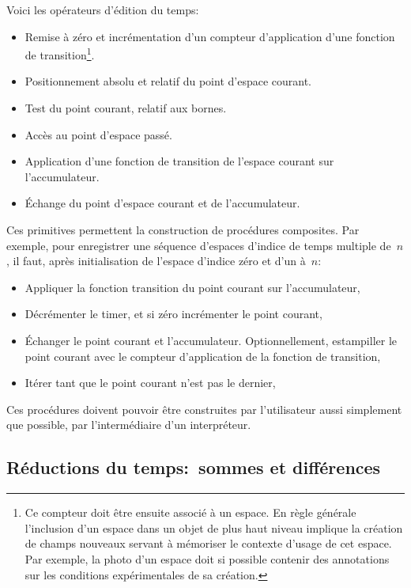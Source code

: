 Voici les op\'erateurs d'\'edition du temps:
\begin{itemize}
\item Remise \`a z\'ero et incr\'ementation d'un compteur d'application
  d'une fonction de transition\footnote{%
    Ce compteur doit \^etre ensuite associ\'e \`a un espace. %
    En r\`egle g\'en\'erale l'inclusion d'un espace dans un objet de plus
    haut niveau implique la cr\'eation de champs nouveaux servant \`a
    m\'emoriser le contexte d'usage de cet espace. %
    Par exemple, la photo d'un espace doit si possible contenir des
    annotations sur les conditions exp\'erimentales de sa cr\'eation.}. %
\item Positionnement absolu et relatif du point d'espace courant. %
\item Test du point courant, relatif aux bornes. %
\item Acc\`es au point d'espace pass\'e. %
\item Application d'une fonction de transition de l'espace courant sur
  l'accumulateur. %
\item \'Echange du point d'espace courant et de l'accumulateur. %
\end{itemize}

Ces primitives permettent la construction de proc\'edures composites. %
Par exemple, pour enregistrer une s\'equence d'espaces d'indice de temps
multiple de~$n$, il faut, apr\`es initialisation de l'espace d'indice
z\'ero et d'un  \`a~$n$:
\begin{itemize}
\item Appliquer la fonction transition du point courant sur
  l'accumulateur,
\item D\'ecr\'ementer le timer, et si z\'ero incr\'ementer le point courant,
\item \'Echanger le point courant et l'accumulateur. %
  Optionnellement, estampiller le point courant avec le compteur
  d'application de la fonction de transition,
\item It\'erer tant que le point courant n'est pas le dernier,
\end{itemize}

Ces proc\'edures doivent pouvoir \^etre construites par l'utilisateur
aussi simplement que possible, par l'interm\'ediaire d'un interpr\'eteur. %

\subsection{R\'eductions du temps:~sommes et diff\'erences}

